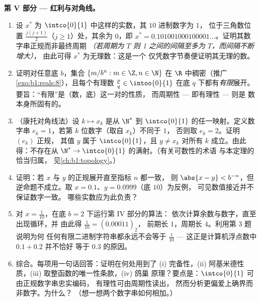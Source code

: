 \begin{problem}
\medskip
\noindent\textbf{第 V 部分 --- 红利与对角线。}
\begin{enumerate}[resume]
  \item 设 $x^*$ 为 $\intco{0}{1}$ 中这样的实数，其 $10$ 进制数字为 $1$，
        位于三角数位置 $\frac{j(j +
        1)}{2}$（$j \geq 1$）处，其余为 $0$，即 $x^* =
        0.101001000100001\dots$。证明其数字串正规而非最终周期
        \emph{（若周期为 $T$
        则 1 之间的间隔至多为 $T$，而间隔不断增大）}，
        由此可得 $x^*$ 为无理数：这是一个
        仅凭数字节奏便证明其无理的数。
  \item 证明对任意底 $b$，集合 $\{m/b^n : m \in \Z,
        n \in \N\}$ 在 $\R$ 中稠密（推广
        \cref{exo:b1:reals:8}），且每个有理数 $\frac pq
        \in \intoo{0}{1}$ 在底 $q$ 下都有\emph{有限}展开。
        要旨：“有限”是（数，底）这一对的性质，
        而周期性 --- 即有理性 --- 则是
        数本身所固有的。
  \item （康托对角线法）设 $k \mapsto x_k$ 是从
        $\N^*$ 到 $\intco{0}{1}$ 的任一映射。定义数字串 $e_k =
        1$，若第 $k$ 位数字（取自 $x_k$）不同于 $1$，
        否则取 $e_k = 2$。证明 $(e_k)$ 正规，
        其值 $y$ 属于 $\intco{0}{1}$，且 $y \neq
        x_k$ 对所有 $k$ 成立。由此得：不存在从 $\N^* \to
        \intco{0}{1}$ 的满射。（有关可数性的术语
        与本定理的恰当归属，
        见\cref{ch:b1:topology}。）
  \item 证明：若 $x$ 与 $y$ 的正规展开直至指标 $n$ 都一致，
        则 $\abs{x - y} < b^{-n}$，但逆命题不成立。取
        $x = 0.1$、$y = 0.0999$（底 $10$）为反例，
        可见数值接近并不保证数字一致。
        哪些实数应为此负责？
  \item 对 $x = \frac{1}{10}$，在底 $b = 2$ 下运行第 IV 部分的算法：
        依次计算余数与数字，直至出现循环，并
        由此得 $\frac{1}{10} = (0.0\overline{0011})_2$，
        前期长 $1$，周期长 $4$。利用第 3 题说明为何
        任何有限二进制字符串都永远不会等于 $\frac{1}{10}$
        --- 这正是计算机浮点数中 $0.1 + 0.2$ 并不恰好
        等于 $0.3$ 的原因。
  \item 综合。每项用一句话回答：证明在何处用到了
        (i) 完备性，(ii) 阿基米德性质，(iii)
        取整函数的唯一性条款，(iv) 鸽巢
        原理？要点是：$\intco{0}{1}$ 可由正规数字串忠实编码，
        有理性可由周期性读出，
        然而分析更偏爱上确界而非数字。为什么？
        （想一想两个数字串如何相加。）
\end{enumerate}
\end{problem}

